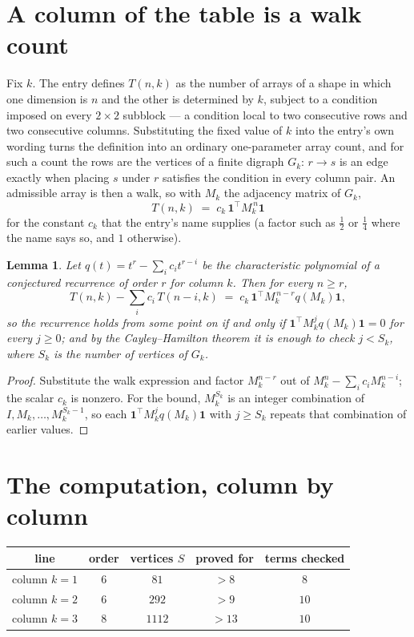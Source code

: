 \documentclass[11pt,a4paper]{article}
\theoremstyle{plain}
\newtheorem{lemma}[theorem]{Lemma}
\theoremstyle{definition}
\begin{document}
\section{A column of the table is a walk count}

Fix $k$. The entry defines $T(n,k)$ as the number of arrays of a shape in which one dimension
is $n$ and the other is determined by $k$, subject to a condition imposed on every
$2\times2$ subblock --- a condition local to two consecutive rows and two consecutive columns.
Substituting the fixed value of $k$ into the entry's own wording turns the definition into an
ordinary one-parameter array count, and for such a count the rows are the vertices of a finite
digraph $G_k$: $r\to s$ is an edge exactly when placing $s$ under $r$ satisfies the condition
in every column pair. An admissible array is then a walk, so with $M_k$ the adjacency matrix
of $G_k$,
\[
T(n,k)\;=\;c_k\,\mathbf{1}^{\!\top}M_k^{\,n}\mathbf{1}
\]
for the constant $c_k$ that the entry's name supplies (a factor such as $\tfrac12$ or
$\tfrac14$ where the name says so, and $1$ otherwise).

\begin{lemma}\label{lem:crit}
Let $q(t)=t^{r}-\sum_i c_it^{r-i}$ be the characteristic polynomial of a conjectured
recurrence of order $r$ for column $k$. Then for every $n\ge r$,
\[
T(n,k)-\sum_i c_i\,T(n-i,k)\;=\;c_k\,\mathbf{1}^{\!\top}M_k^{\,n-r}q(M_k)\mathbf{1},
\]
so the recurrence holds from some point on if and only if
$\mathbf{1}^{\!\top}M_k^{j}q(M_k)\mathbf{1}=0$ for every $j\ge0$; and by the
Cayley--Hamilton theorem it is enough to check $j<S_k$, where $S_k$ is the number of vertices
of $G_k$.
\end{lemma}

\begin{proof}
Substitute the walk expression and factor $M_k^{n-r}$ out of $M_k^{n}-\sum_ic_iM_k^{n-i}$;
the scalar $c_k$ is nonzero. For the bound, $M_k^{S_k}$ is an integer combination of
$I,M_k,\dots,M_k^{S_k-1}$, so each $\mathbf{1}^{\!\top}M_k^{j}q(M_k)\mathbf{1}$ with
$j\ge S_k$ repeats that combination of earlier values.
\end{proof}

\section{The computation, column by column}

\begin{center}
\begin{tabular}{ccccc}
line & order & vertices $S$ & proved for & terms checked \\ \hline
column $k$$=1$ & $6$ & $81$ & $>8$ & $8$ \\
column $k$$=2$ & $6$ & $292$ & $>9$ & $10$ \\
column $k$$=3$ & $8$ & $1112$ & $>13$ & $10$ \\
\end{tabular}
\end{center}
\end{document}
